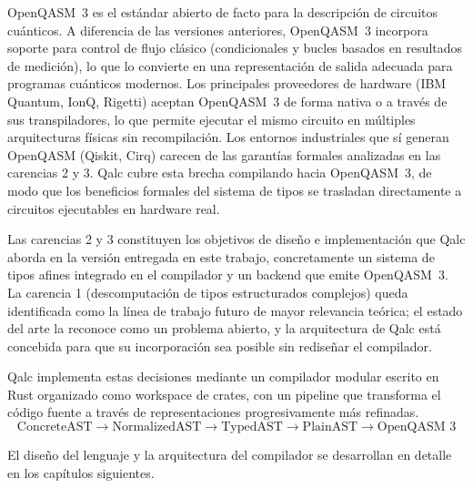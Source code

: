 OpenQASM~3 es el estándar abierto de facto para la descripción de circuitos cuánticos. A diferencia de las versiones anteriores, OpenQASM~3 incorpora soporte para control de flujo clásico (condicionales y bucles basados en resultados de medición), lo que lo convierte en una representación de salida adecuada para programas cuánticos modernos. Los principales proveedores de hardware (IBM Quantum, IonQ, Rigetti) aceptan OpenQASM~3 de forma nativa o a través de sus transpiladores, lo que permite ejecutar el mismo circuito en múltiples arquitecturas físicas sin recompilación. Los entornos industriales que sí generan OpenQASM (Qiskit, Cirq) carecen de las garantías formales analizadas en las carencias 2 y 3. Qalc cubre esta brecha compilando hacia OpenQASM~3, de modo que los beneficios formales del sistema de tipos se trasladan directamente a circuitos ejecutables en hardware real.

Las carencias 2 y 3 constituyen los objetivos de diseño e implementación que Qalc aborda en la versión entregada en este trabajo, concretamente un sistema de tipos afines integrado en el compilador y un backend que emite OpenQASM~3. La carencia 1 (descomputación de tipos estructurados complejos) queda identificada como la línea de trabajo futuro de mayor relevancia teórica; el estado del arte la reconoce como un problema abierto, y la arquitectura de Qalc está concebida para que su incorporación sea posible sin rediseñar el compilador.

Qalc implementa estas decisiones mediante un compilador modular escrito en Rust organizado como workspace de crates, con un pipeline que transforma el código fuente a través de representaciones progresivamente más refinadas.
\[\text{ConcreteAST} \to \text{NormalizedAST} \to \text{TypedAST} \to \text{PlainAST} \to \text{OpenQASM~3}\]

El diseño del lenguaje y la arquitectura del compilador se desarrollan en detalle en los capítulos siguientes.
